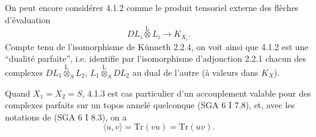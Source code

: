 On peut encore considérer 4.1.2 comme le produit tensoriel externe des flèches d'évaluation
\[
DL_i\overset{\mathrm{L}}{\otimes}L_i\longrightarrow K_{X_i}.
\]
Compte tenu de l'isomorphisme de Künneth 2.2.4, on voit ainsi que 4.1.2 est une ``dualité parfaite'', i.e. identifie par l'isomorphisme d'adjonction 2.2.1 chacun des complexes $DL_1\overset{\mathrm{L}}{\otimes}_S L_2$, $L_1\overset{\mathrm{L}}{\otimes}_S DL_2$ au dual de l'autre (à valeurs dans $K_X$).

Quand $X_1=X_2=S$, 4.1.3 est cas particulier d'un accouplement valable pour des complexes parfaits sur un topos annelé quelconque (SGA 6 I 7.8), et, avec les notations de (SGA 6 I 8.3), on a
\begin{equation}
\langle u,v\rangle=\mathrm{Tr}(vu)=\mathrm{Tr}(uv).
\tag{4.1.5}
\end{equation}

